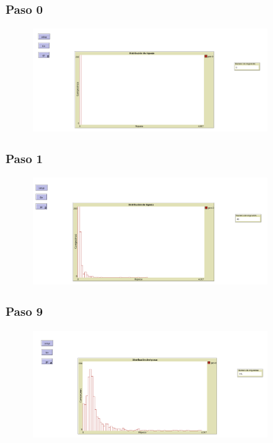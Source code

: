\documentclass[17pt, t, lualatex]{beamer}
\begin{document}
\insertsectionpage

\begin{frame}
  \frametitle{Paso 0}
  \begin{figure}[ht]
    \centering
    \includegraphics[width = 0.8\textwidth]{img/img4.png}
  \end{figure}
\end{frame}


\begin{frame}
  \frametitle{Paso 1}
  \begin{figure}[ht]
    \centering
    \includegraphics[width = 0.8\textwidth]{img/img5.png}
  \end{figure}
\end{frame}

\begin{frame}
  \frametitle{Paso 9}
  \begin{figure}[ht]
    \centering
    \includegraphics[width = 0.8\textwidth]{img/img6.png}
  \end{figure}
\end{frame}
\end{document}
